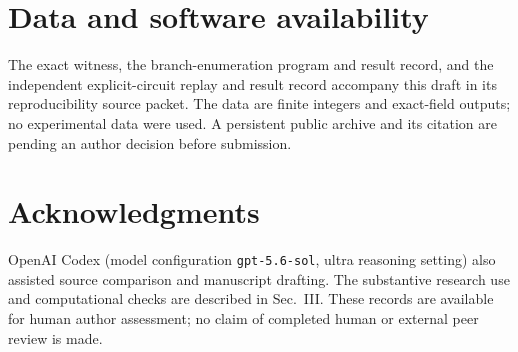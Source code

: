 \documentclass[aps,pra,reprint,floatfix,superscriptaddress,nofootinbib]{revtex4-2}
\begin{document}
\section*{Data and software availability}
The exact witness, the branch-enumeration program and result record, and the independent explicit-circuit replay and result record accompany this draft in its reproducibility source packet. The data are finite integers and exact-field outputs; no experimental data were used. A persistent public archive and its citation are pending an author decision before submission.

\section*{Acknowledgments}
OpenAI Codex (model configuration \texttt{gpt-5.6-sol}, ultra reasoning setting) also assisted source comparison and manuscript drafting. The substantive research use and computational checks are described in Sec.~III. These records are available for human author assessment; no claim of completed human or external peer review is made.


\end{document}
